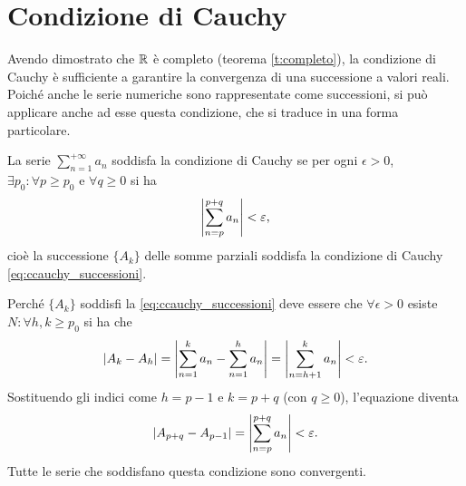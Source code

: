 \section{Condizione di Cauchy}
Avendo dimostrato che $\mathbb{R}$ è completo (teorema \ref{t:completo}), la condizione di Cauchy è sufficiente a garantire la convergenza di una successione a valori reali. Poiché anche le serie numeriche sono rappresentate come successioni, si può applicare anche ad esse questa condizione, che si traduce in una forma particolare.
\begin{definizione}
\label{d:ccauchy_serie}
La serie $\sum_{n=1}^{+\infty}a_n$ soddisfa la condizione di Cauchy se per ogni $\epsilon>0$, $\exists p_0\colon\forall p\geq p_0$ e $\forall q\geq 0$ si ha
\begin{equation}
\label{eq:ccauchy_serie}
\left|{\sum_{n=p}^{p+q}a_n}\right|<\varepsilon,
\end{equation}
cioè la successione $\{A_k\}$ delle somme parziali soddisfa la condizione di Cauchy \ref{eq:ccauchy_successioni}.
\end{definizione}
Perché $\{A_k\}$ soddisfi la \ref{eq:ccauchy_successioni} deve essere che $\forall\epsilon>0$ esiste $N\colon\forall h,k\geq p_0$ si ha che
\[
\left|{A_k-A_h}\right|=\left|{\sum_{n=1}^ka_n-\sum_{n=1}^ha_n}\right|=\left|{\sum_{n=h+1}^ka_n}\right|<\varepsilon.
\]
Sostituendo gli indici come $h=p-1$ e $k=p+q$ (con $q\geq 0$), l'equazione diventa
\[
\left|{A_{p+q}-A_{p-1}}\right|=\left|{\sum_{n=p}^{p+q}a_n}\right|<\varepsilon.
\]
Tutte le serie che soddisfano questa condizione sono convergenti.
